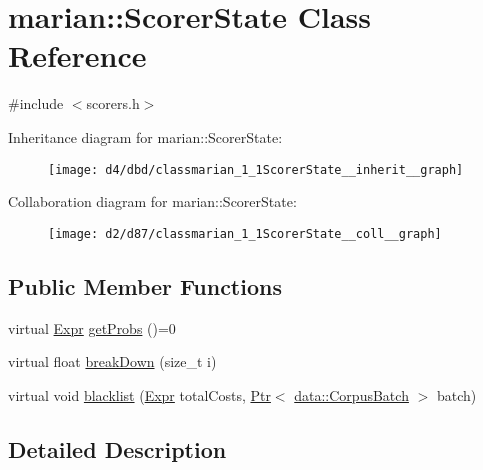 \hypertarget{classmarian_1_1ScorerState}{}\section{marian\+:\+:Scorer\+State Class Reference}
\label{classmarian_1_1ScorerState}


{\ttfamily \#include $<$scorers.\+h$>$}



Inheritance diagram for marian\+:\+:Scorer\+State\+:
\nopagebreak
\begin{figure}[H]
\begin{center}
\leavevmode
\texttt{[image: d4/dbd/classmarian\_1\_1ScorerState\_\_inherit\_\_graph]}
\end{center}
\end{figure}


Collaboration diagram for marian\+:\+:Scorer\+State\+:
\nopagebreak
\begin{figure}[H]
\begin{center}
\leavevmode
\texttt{[image: d2/d87/classmarian\_1\_1ScorerState\_\_coll\_\_graph]}
\end{center}
\end{figure}
\subsection*{Public Member Functions}
\begin{DoxyCompactItemize}
\item 
virtual \hyperlink{namespacemarian_a498d8baf75b754011078b890b39c8e12}{Expr} \hyperlink{classmarian_1_1ScorerState_a438e0327d2913a70bbebe80765e04395}{get\+Probs} ()=0
\item 
virtual float \hyperlink{classmarian_1_1ScorerState_a3318dc52892b0f22efd4e3d6fd93bd97}{break\+Down} (size\+\_\+t i)
\item 
virtual void \hyperlink{classmarian_1_1ScorerState_a81f5db49f9528f950a633771136b768f}{blacklist} (\hyperlink{namespacemarian_a498d8baf75b754011078b890b39c8e12}{Expr} total\+Costs, \hyperlink{namespacemarian_ad1a373be43a00ef9ce35666145137b08}{Ptr}$<$ \hyperlink{classmarian_1_1data_1_1CorpusBatch}{data\+::\+Corpus\+Batch} $>$ batch)
\end{DoxyCompactItemize}


\subsection{Detailed Description}


